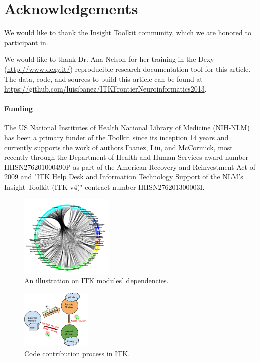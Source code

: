 \documentclass{frontiersENG} %
\begin{document}
\section*{Acknowledgements}

We would like to thank the Insight Toolkit community, which we are honored to
participant in.

We would like to thank Dr. Ana Nelson for her training in the Dexy
(\url{http://www.dexy.it/}) reproducible research documentation tool for this
article.  The data, code, and sources to build this article can be found at
\url{https://github.com/luisibanez/ITKFrontierNeuroinformatics2013}.

\paragraph{Funding\textcolon} The US National Institutes of Health National
Library of Medicine (NIH-NLM) has been a primary funder of the Toolkit since
its inception 14 years and currently supports the work of authors Ibanez, Liu,
and McCormick, most recently through the Department of Health and Human
Services award number HHSN276201000490P as part of the American Recovery and
Reinvestment Act of 2009 and "ITK Help Desk and Information Technology Support
of the NLM's Insight Toolkit (ITK-v4)" contract number HHSN276201300003I.


\begin{figure}
  \centering
    \includegraphics[width=0.4\textwidth]{itk_module_dependency.png}
    \caption{ An illustration on ITK modules' dependencies.}
    \label{fig:itk_module_dependency}
\end{figure}

\begin{figure}
  \centering
    \includegraphics[width=0.3\textwidth]{itk_code_contribution.png}
    \caption{ Code contribution process in ITK.}
    \label{fig:itk_code_contribution}
\end{figure}
\end{document}
